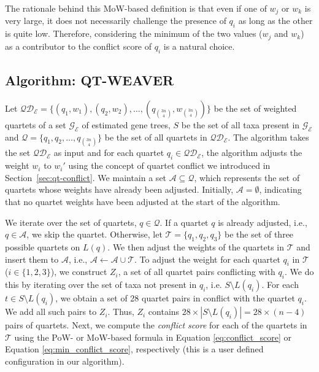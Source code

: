 \documentclass[runningheads]{llncs}
\newcommand{\addb}[1]{{\color{red} #1}}
\begin{document}
The rationale behind this MoW-based definition is that even if one of $w_j$ or $w_k$ is very large, it does not necessarily challenge the presence of $q_i$ as long as the other is quite low. Therefore, considering the minimum of the two values ($w_j$ and $w_k$) as a contributor to the conflict score of $q_i$ is a natural choice.


\subsection{Algorithm: QT-WEAVER}
\label{sec:qt-weaver-algorithm}

Let $\mathcal{QD_E} = \{ (q_1,w_1), (q_2,w_2), \ldots, (q_{3n \choose 4},w_{3n \choose 4}) \}$ be the set of weighted quartets of a set $\mathcal{G_E}$ of estimated gene trees, $S$ be the set of all taxa present in  $\mathcal{G_E}$ and $\mathcal{Q} = \{ q_1, q_2, \ldots,q_{3n \choose 4} \} $ be the set of all quartets in $\mathcal{QD_E}$. The algorithm takes the set $\mathcal{QD_E}$ as input and for each quartet $q_i \in \mathcal{QD_E}$, the algorithm adjusts the weight $w_i$ to $w_i'$ using the concept of quartet conflict we introduced in Section~\ref{sec:qt-conflict}. We maintain a set \( \mathcal{A} \subseteq \mathcal{Q} \), which represents the set of quartets whose weights have already been adjusted.  Initially, \( \mathcal{A} = \emptyset \), indicating that no quartet weights have been adjusted at the start of the algorithm.

We iterate over the set of quartets, $q \in \mathcal{Q}$. If a quartet $q$ is already adjusted, i.e., $ q \in \mathcal{A} $, we skip the quartet. Otherwise, let $ \mathcal{T} = \{q_1, q_2, q_3\}$ be the set of three possible quartets on $L(q)$. %
We then adjust the weights of the quartets in $\mathcal{T}$ and insert them to $\mathcal{A}$, i.e., $\mathcal{A} \leftarrow \mathcal{A} \cup \mathcal{T}$. To adjust the weight for each quartet $q_i$ in $\mathcal{T}$ ($i \in \{ 1,2,3\}$), we construct $Z_i$, a set of all quartet pairs conflicting with $q_i$. %
We do this by iterating over the set of taxa not present in $q_i$, i.e. $S \setminus L(q_i)$. 
For each $t \in S \setminus L(q_i)$, we obtain a set of 28 quartet pairs in conflict with the quartet $q_i$. We add all such pairs to $Z_i$. Thus, $Z_i$ contains $28\times|S \setminus L(q_i)| = 28 \times (n-4)$ pairs of quartets. Next, we compute the \textit{conflict score} for each of the quartets in $\mathcal{T}$ using the PoW- or MoW-based formula in Equation \eqref{eq:conflict_score} or Equation \eqref{eq:min_conflict_score}, respectively (this is a user defined configuration in our algorithm).
\end{document}
